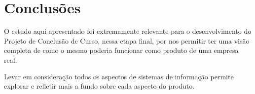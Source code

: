 \chapter{Conclusões}

O estudo aqui apresentado foi extremamente relevante para o desenvolvimento do Projeto de Conclusão de Curso, nessa etapa final, por nos permitir ter uma visão completa de como o mesmo poderia funcionar como produto de uma empresa real.

Levar em consideração todos os aspectos de sistemas de informação permite explorar e refletir mais a fundo sobre cada aspecto do produto.